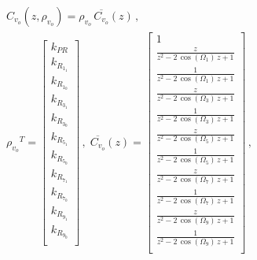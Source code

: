 \documentclass[repeatfields,oneside,overleaf]{tcc}
\newcommand{\mycdot}{ \, }
\newcommand{\myvo}{ {v_o} }
\newcommand{\myC}[2][]{ C_{#1} \left( #2 \right) }
\newcommand{\myoC}[2][]{ \overline{C_{#1}} \left( #2 \right) }
\newcommand{\myCzrho}[1]{ \myC[#1]{z, \rho_{#1}} }
\begin{document}
\begin{equation}
\begin{gathered}
    \myCzrho{\myvo} = \rho_\myvo \mycdot \myoC[\myvo]{z}
    \,,
    \\
    {\rho_\myvo}^T =
    \begin{bmatrix}
        k_{PR} \\
        k_{R_{1_{1}}} \\
        k_{R_{1_{0}}} \\
        k_{R_{3_{1}}} \\
        k_{R_{3_{0}}} \\
        k_{R_{5_{1}}} \\
        k_{R_{5_{0}}} \\
        k_{R_{7_{1}}} \\
        k_{R_{7_{0}}} \\
        k_{R_{9_{1}}} \\
        k_{R_{9_{0}}} \\
    \end{bmatrix}
    \,,\;
    \myoC[\myvo]{z} =
    \begin{bmatrix}
        1 \\
        \frac{ z }{ z^2 - 2 \mycdot \cos \left( \Omega_1 \right) \mycdot z + 1 } \\
        \frac{ 1 }{ z^2 - 2 \mycdot \cos \left( \Omega_1 \right) \mycdot z + 1 } \\
        \frac{ z }{ z^2 - 2 \mycdot \cos \left( \Omega_3 \right) \mycdot z + 1 } \\
        \frac{ 1 }{ z^2 - 2 \mycdot \cos \left( \Omega_3 \right) \mycdot z + 1 } \\
        \frac{ z }{ z^2 - 2 \mycdot \cos \left( \Omega_5 \right) \mycdot z + 1 } \\
        \frac{ 1 }{ z^2 - 2 \mycdot \cos \left( \Omega_5 \right) \mycdot z + 1 } \\
        \frac{ z }{ z^2 - 2 \mycdot \cos \left( \Omega_7 \right) \mycdot z + 1 } \\
        \frac{ 1 }{ z^2 - 2 \mycdot \cos \left( \Omega_7 \right) \mycdot z + 1 } \\
        \frac{ z }{ z^2 - 2 \mycdot \cos \left( \Omega_9 \right) \mycdot z + 1 } \\
        \frac{ 1 }{ z^2 - 2 \mycdot \cos \left( \Omega_9 \right) \mycdot z + 1 } \\
    \end{bmatrix}
    \,,
\end{gathered}
\end{equation}
\end{document}
